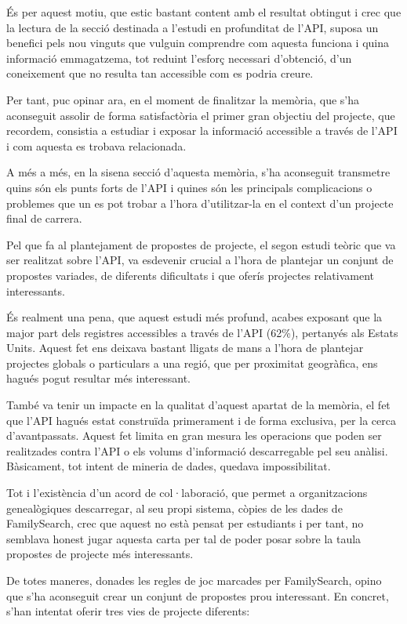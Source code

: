     És per aquest motiu, que estic bastant content amb el resultat obtingut i crec que la lectura de la secció destinada a l’estudi en profunditat de l’API, suposa un benefici pels nou vinguts que vulguin comprendre com aquesta funciona i quina informació emmagatzema, tot reduint l’esforç necessari d’obtenció, d’un coneixement que no resulta tan accessible com es podria creure.

    Per tant, puc opinar ara, en el moment de finalitzar la memòria, que s’ha aconseguit assolir de forma satisfactòria el primer gran objectiu del projecte, que recordem, consistia a estudiar i exposar la informació accessible a través de l’API i com aquesta es trobava relacionada.

    A més a més, en la sisena secció d'aquesta memòria, s'ha aconseguit transmetre quins són els punts forts de l'API i quines són les principals complicacions o problemes que un es pot trobar a l'hora d'utilitzar-la en el context d'un projecte final de carrera.

    Pel que fa al plantejament de propostes de projecte, el segon estudi teòric que va ser realitzat sobre l’API, va esdevenir crucial a l’hora de plantejar un conjunt de propostes variades, de diferents dificultats i que oferís projectes relativament inte\-re\-ssants.

    És realment una pena, que aquest estudi més profund, acabes exposant que la major part dels registres accessibles a través de l’API (62\%), pertanyés als Estats Units. Aquest fet ens deixava bastant lligats de mans a l’hora de plantejar projectes globals o particulars a una regió, que per proximitat geogràfica, ens hagués pogut resultar més interessant.

    També va tenir un impacte en la qualitat d’aquest apartat de la memòria, el fet que l’API hagués estat construïda primerament i de forma exclusiva, per la cerca d’avantpassats. Aquest fet limita en gran mesura les operacions que poden ser realitzades contra l’API o els volums d’informació descarregable pel seu anàlisi. Bàsicament, tot intent de mineria de dades, quedava impossibilitat.

    Tot i l’existència d’un acord de col·laboració, que permet a organitzacions genealògiques descarregar, al seu propi sistema, còpies de les dades de FamilySearch, crec que aquest no està pensat per estudiants i per tant, no semblava honest jugar aquesta carta per tal de poder posar sobre la taula propostes de projecte més interessants.

    De totes maneres, donades les regles de joc marcades per FamilySearch, opino que s’ha aconseguit crear un conjunt de propostes prou interessant. En concret, s’han intentat oferir tres vies de projecte diferents:

